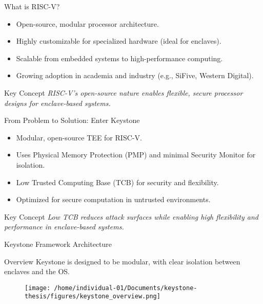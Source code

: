 \documentclass[aspectratio=169]{beamer}
\begin{document}
\begin{frame}{What is RISC-V?}
\begin{itemize}
    \item Open-source, modular processor architecture.
    \item Highly customizable for specialized hardware (ideal for enclaves).
    \item Scalable from embedded systems to high-performance computing.
    \item Growing adoption in academia and industry (e.g., SiFive, Western Digital).
\end{itemize}
\begin{block}{Key Concept}
\textit{RISC-V’s open-source nature enables flexible, secure processor designs for enclave-based systems.}
\end{block}
\end{frame}

\begin{frame}{From Problem to Solution: Enter Keystone}
\begin{itemize}
    \item Modular, open-source TEE for RISC-V.
    \item Uses Physical Memory Protection (PMP) and minimal Security Monitor for isolation.
    \item Low Trusted Computing Base (TCB) for security and flexibility.
    \item Optimized for secure computation in untrusted environments.
\end{itemize}
\begin{block}{Key Concept}
\textit{Low TCB reduces attack surfaces while enabling high flexibility and performance in enclave-based systems.}
\end{block}
\end{frame}

\begin{frame}{Keystone Framework Architecture}
\begin{block}{Overview}
    Keystone is designed to be modular, with clear isolation between enclaves and the OS.
\end{block}

\begin{figure}[htbp]
\centering
\texttt{[image: /home/individual-01/Documents/keystone-thesis/figures/keystone\_overview.png]}
\label{fig:keystone_grouped}
\end{figure}
\end{frame}
\end{document}
